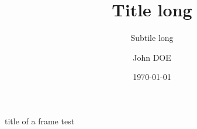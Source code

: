 \documentclass[notheorems, noamsthm, aspectratio=169, 10pt]{beamer}
\title[shorttitle]{Title long}
\subtitle[shortsubtitle]{Subtile long}
\date[shortdate]{\today}
\author[john.doe@mail.com]{John DOE\inst{1}}
\institute[shortinstitute]{\inst{1} An Awesome Company}
\begin{document}

\begin{frame}{title of a frame}
   test
\end{frame}
\end{document}
